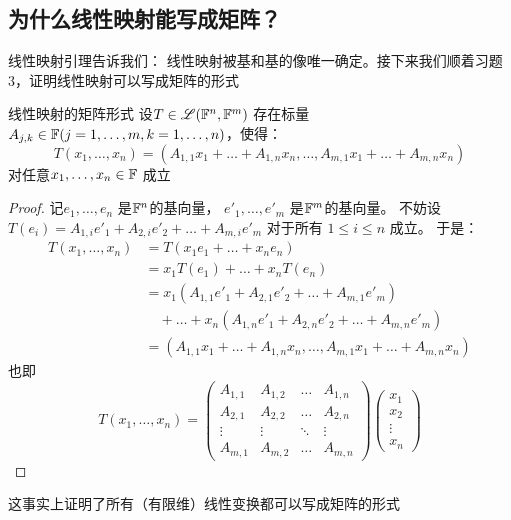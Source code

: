 \subsection{为什么线性映射能写成矩阵？}
线性映射引理告诉我们： 线性映射被基和基的像唯一确定。接下来我们顺着习题3，证明线性映射可以写成矩阵的形式
\begin{theorem}{线性映射的矩阵形式}
    设\(T \in \mathscr{L}(\mathbb{F}^{n},\mathbb{F}^{m})\)
    存在标量\(A_{j,k} \in
    \mathbb{F} (j = 1, \dots ,m, k=1, \dots, n) \)，使得：
    \[
        T(x_{1},\dots,x_{n})=(A_{1,1}x_{1}+\dots+A_{1,n}x_{n},\dots,A_{m,1}x_{1}+\dots+A_{m,n}x_{n})
    \]
    对任意\(x_{1},\dots,x_{n} \in \mathbb{F}\) 成立
\end{theorem}

\begin{proof}
    记\(e_{1}, \dots, e_{n}\) 是\(\mathbb{F}^{n}\)的基向量，
    \(e'_{1}, \dots, e'_{m}\)
    是\(\mathbb{F}^{m}\)的基向量。
    不妨设 \(T(e_{i}) = A_{1,i}e'_{1} +
        A_{2,i}e'_{2} + \dots +
    A_{m,i}e'_{m}\) 对于所有 \(1\leq i\leq n\) 成立。
    于是：
    \begin{align*}
        T(x_{1},\dots,x_{n}) &= T(x_{1}e_{1} + \dots +
        x_{n}e_{n})\\
        &= x_{1}T(e_{1}) + \dots + x_{n}T(e_{n})\\
        &= x_{1}(A_{1,1}e'_{1} + A_{2,1}e'_{2} +
        \dots + A_{m,1}e'_{m}) \nonumber \\
        &\quad + \dots +
        x_{n}(A_{1,n}e'_{1} + A_{2,n}e'_{2} +
        \dots + A_{m,n}e'_{m})\\    &=
        (A_{1,1}x_{1}+\dots+A_{1,n}x_{n},\dots,A_{m,1}x_{1}+\dots+A_{m,n}x_{n})
    \end{align*}
    也即\[
        T(x_1, \dots, x_n) =
        \begin{pmatrix}
            A_{1,1} & A_{1,2} & \dots & A_{1,n} \\
            A_{2,1} & A_{2,2} & \dots & A_{2,n} \\
            \vdots  & \vdots  & \ddots & \vdots  \\
            A_{m,1} & A_{m,2} & \dots & A_{m,n}
        \end{pmatrix}
        \begin{pmatrix}
            x_1 \\
            x_2 \\
            \vdots \\
            x_n
        \end{pmatrix}
    \]
\end{proof}
这事实上证明了所有（有限维）线性变换都可以写成矩阵的形式

